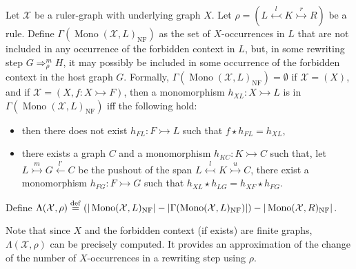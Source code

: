 \begin{definition}
    \label{antipattern:def:gamma_l_rho_x}
    Let $\mathcal{X}$ be a ruler-graph with underlying graph $X$. 
    Let \( \rho = (L \overset{l}{\leftarrowtail} K \overset{r}{\rightarrowtail} R) \) be a rule.
    Define $\Gamma(\operatorname{Mono}(\mathcal{X},L)_{\operatorname{NF}})$ as the set of $X$-occurrences in $L$ that are not included in any occurrence of the forbidden context in $L$, but, in some rewriting step $G \Rightarrow_\rho^m H$, it may possibly be included in some occurrence of the forbidden context in the host graph $G$. 
    Formally,  $\Gamma(\operatorname{Mono}(\mathcal{X},L)_{\operatorname{NF}}) = \emptyset$ if $\mathcal{X} = (X)$, and if $\mathcal{X} = (X, f:X \rightarrowtail F)$, then a monomorphism $h_{XL}:X \rightarrowtail L$ is in $\Gamma(\operatorname{Mono}(\mathcal{X},L)_{\operatorname{NF}})$ iff the following hold:
    \begin{itemize}
        \item then there does not exist $h_{FL}:F \rightarrowtail L$ such that $f \star h_{FL} = h_{XL}$,
         \item there exists a graph $C$ and a monomorphism $h_{KC}:K \rightarrowtail C$ such that, let $L \overset{m}{\rightarrowtail} G \overset{l'}{\leftarrow} C$ be the pushout of the span $L \overset{l}{\leftarrowtail} K \overset{u}{\rightarrowtail} C$, there exist a monomorphism $h_{FG} : F \rightarrowtail G$ such that $h_{XL} \star h_{LG} = h_{XF} \star h_{FG}$. 
    \end{itemize}
    Define $\Lambda(\mathcal{X},\rho) \overset{\operatorname{def}}{=} (|\operatorname{Mono}(\mathcal{X},L)_{\operatorname{NF}}| - 
    |\Gamma(\operatorname{Mono}(\mathcal{X},L)_{\operatorname{NF}})|) -
   |\operatorname{Mono}(\mathcal{X},R)_{\operatorname{NF}}|$. 
\end{definition}
Note that since $X$ and the forbidden context (if exists) are finite graphs, $\Lambda(\mathcal{X},\rho)$ can be precisely computed. It provides an approximation of the change of the number of $X$-occurrences in a rewriting step using $\rho$.

